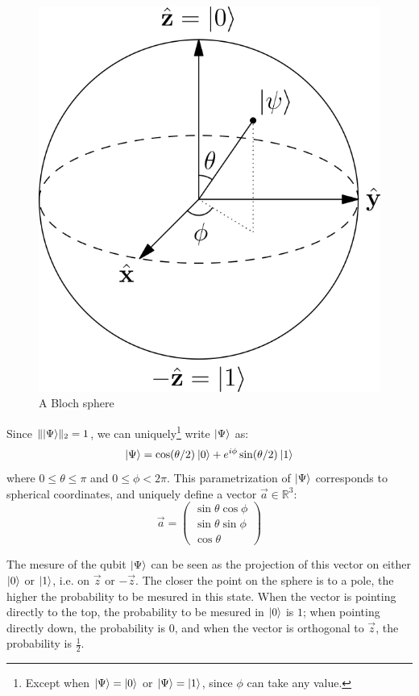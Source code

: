 \documentclass[12pt,a4paper]{article}
\theoremstyle{definition}
\DeclarePairedDelimiter\ket{\lvert}{\rangle}
\begin{document}
\setlength{\columnsep}{0pt}
\begin{figure}
    \centering
    \includegraphics*{bloch-sphere}
    \caption{A Bloch sphere}
\end{figure}

Since $\|\ket{\Psi}\|_2=1$, we can uniquely\footnote{Except when $\ket{\Psi}=\ket{0}$ or $\ket{\Psi}=\ket{1}$, since $\phi$ can take any value.} write $\ket{\Psi}$ as:
\begin{equation*}
    \ket{\Psi}=\cos(\theta/2)\:\ket{0} + e^{i\phi}\sin(\theta/2)\: \ket{1}
\end{equation*}
where $0\leq\theta\leq\pi$ and $0\leq\phi<2\pi$. This parametrization of $\ket{\Psi}$ corresponds to spherical coordinates, and uniquely define a vector $\vec{a}\in\mathbb{R}^3$:
\begin{equation*}
    \vec{a}=\begin{pmatrix}\sin\theta\cos\phi\\\sin\theta\sin\phi\\\cos\theta\end{pmatrix}
\end{equation*}

The mesure of the qubit $\ket{\Psi}$ can be seen as the projection of this vector on either $\ket{0}$ or $\ket{1}$, i.e. on $\vec{z}$ or $-\vec{z}$. The closer the point on the sphere is to a pole, the higher the probability to be mesured in this state. When the vector is pointing directly to the top, the probability to be mesured in $\ket{0}$ is $1$; when pointing directly down, the probability is $0$, and when the vector is orthogonal to $\vec{z}$, the probability is $\frac{1}{2}$.
\end{document}
